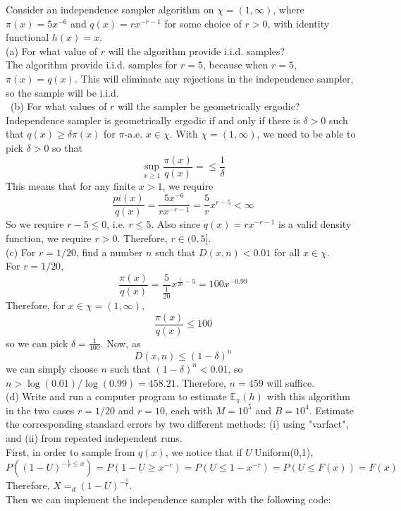 
Consider an independence sampler algorithm on $\chi=(1,\infty)$, where $\pi(x)=5x^{-6}$ and $q(x)=rx^{-r-1}$ for some choice of $r>0$, with identity functional $h(x)=x$. \\
(a) For what value of $r$ will the algorithm provide i.i.d. samples?\\
The algorithm provide i.i.d. samples for $r=5$, because when $r=5$, $\pi(x)=q(x)$. This will eliminate any rejections in the independence sampler, so the sample will be i.i.d.\\\
(b) For what values of $r$ will the sampler be geometrically ergodic?\\
Independence sampler is geometrically ergodic if and only if there is $\delta>0$ such that $q(x)\ge \delta\pi(x)$ for $\pi$-a.e. $x\in \chi$.
With $\chi=(1,\infty)$, we need to be able to pick $\delta>0$ so that 
$$\sup_{x\ge 1}\frac{\pi(x)}{q(x)}=\le \frac{1}{\delta}$$
This means that for any finite $x>1$, we require
$$\frac{pi(x)}{q(x)}=\frac{5x^{-6}}{rx^{-r-1}}=\frac{5}{r}x^{r-5}<\infty$$
So we require $r-5\le 0$, i.e. $r\le 5$. Also since $q(x)=rx^{-r-1}$ is a valid density function, we require $r>0$. Therefore, $r\in(0,5]$.\\
(c) For $r=1/20$, find a number $n$ such that $D(x,n)<0.01$ for all $x\in\chi$.\\
For $r=1/20$, 
$$\frac{\pi(x)}{q(x)}=\frac{5}{\frac{1}{20}}x^{\frac{1}{20}-5}=100x^{-0.99}$$
Therefore, for $x\in\chi=(1,\infty)$, $$\frac{\pi(x)}{q(x)}\le 100$$
so we can pick $\delta=\frac{1}{100}$. Now, as $$D(x,n)\le(1-\delta)^n$$ we can simply choose $n$ such that $(1-\delta)^n<0.01$, so $n>\log(0.01)/\log(0.99)=458.21$. Therefore, $n=459$ will suffice. \\
(d) Write and run a computer program to estimate $\mathbb{E}_\pi(h)$ with this algorithm in the two cases $r=1/20$ and $r=10$, each with $M=10^5$ and $B=10^4$. Estimate the corresponding standard errors by two different methods: (i) using "varfact", and (ii) from repeated independent runs.\\
First, in order to sample from $q(x)$, we notice that if $U~$Uniform(0,1), 
$$P((1-U)^{-\frac{1}{r}\le x}) = P(1-U\ge x^{-r}) = P(U\le 1-x^{-r}) = P(U\le F(x)) = F(x)$$
Therefore, $X=_d(1-U)^{-\frac{1}{r}}$.\\
Then we can implement the independence sampler with the following code:\\
